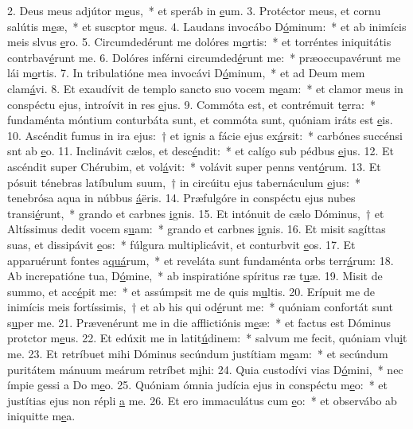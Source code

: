 2. Deus meus adjútor m\uline{e}us,~* et speráb in \uline{e}um.
3. Protéctor meus, et cornu salútis m\uline{e}æ,~* et suscptor m\uline{e}us.
4. Laudans invocábo D\uline{ó}minum:~* et ab inimícis meis slvus \uline{e}ro.
5. Circumdedérunt me dolóres m\uline{o}rtis:~* et torréntes iniquitátis contrbav\uline{é}runt me.
6. Dolóres inférni circumded\uline{é}runt me:~* præoccupavérunt me lái m\uline{o}rtis.
7. In tribulatióne mea invocávi D\uline{ó}minum,~* et ad Deum mem clam\uline{á}vi.
8. Et exaudívit de templo sancto suo vocem m\uline{e}am:~* et clamor meus in conspéctu ejus, introívit in res \uline{e}jus.
9. Commóta est, et contrémuit t\uline{e}rra:~* fundaménta móntium conturbáta sunt, et commóta sunt, quóniam iráts est \uline{e}is.
10. Ascéndit fumus in ira ejus:~† et ignis a fácie ejus ex\uline{á}rsit:~* carbónes succénsi snt ab \uline{e}o.
11. Inclinávit cælos, et desc\uline{é}ndit:~* et calígo sub pédbus \uline{e}jus.
12. Et ascéndit super Chérubim, et vol\uline{á}vit:~* volávit super penns vent\uline{ó}rum.
13. Et pósuit ténebras latíbulum suum,~† in circúitu ejus tabernáculum \uline{e}jus:~* tenebrósa aqua in núbbus \uline{á}ëris.
14. Præfulgóre in conspéctu ejus nubes transi\uline{é}runt,~* grando et carbnes \uline{i}gnis.
15. Et intónuit de cælo Dóminus,~† et Altíssimus dedit vocem s\uline{u}am:~* grando et carbnes \uline{i}gnis.
16. Et misit sagíttas suas, et dissipávit \uline{e}os:~* fúlgura multiplicávit, et conturbvit \uline{e}os.
17. Et apparuérunt fontes a\uline{quá}rum,~* et reveláta sunt fundaménta orbs terr\uline{á}rum:
18. Ab increpatióne tua, D\uline{ó}mine,~* ab inspiratióne spíritus ræ t\uline{u}æ.
19. Misit de summo, et acc\uline{é}pit me:~* et assúmpsit me de quis m\uline{u}ltis.
20. Erípuit me de inimícis meis fortíssimis,~† et ab his qui od\uline{é}runt me:~* quóniam confortát sunt s\uline{u}per me.
21. Prævenérunt me in die afflictiónis m\uline{e}æ:~* et factus est Dóminus protctor m\uline{e}us.
22. Et edúxit me in latit\uline{ú}dinem:~* salvum me fecit, quóniam vlu\uline{i}t me.
23. Et retríbuet mihi Dóminus secúndum justítiam m\uline{e}am:~* et secúndum puritátem mánuum meárum retríbet m\uline{i}hi:
24. Quia custodívi vias D\uline{ó}mini,~* nec ímpie gessi a Do m\uline{e}o.
25. Quóniam ómnia judícia ejus in conspéctu m\uline{e}o:~* et justítias ejus non répli \uline{a} me.
26. Et ero immaculátus cum \uline{e}o:~* et observábo ab iniquitte m\uline{e}a.
